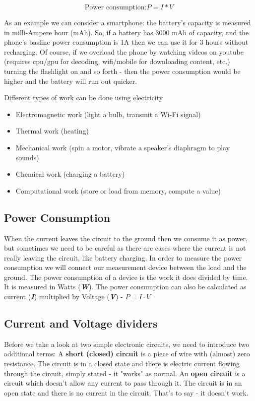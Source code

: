 \begin{displaymath}\label{eq:power_consumption}
    \textrm{Power consumption:} P=I*V
\end{displaymath}

As an example we can consider a smartphone: the battery's capacity is measured in milli-Ampere hour (mAh).
So, if a battery has 3000 mAh of capacity, and the phone's basline power consumption is 1A  then we can use it
for 3 hours without recharging. Of course, if we overload the phone by watching videos on youtube (requires cpu/gpu for decoding, wifi/mobile for downloading content, etc.)
turning the flashlight on and so forth - then the power consumption would be higher and the battery will run out quicker. 

Different types of work can be done using electricity
\begin{itemize}
    \item Electromagnetic work (light a bulb, transmit a Wi-Fi signal)
    \item Thermal work (heating)
    \item Mechanical work (spin a motor, vibrate a speaker's diaphragm to play sounds)
    \item Chemical work (charging a battery)
    \item Computational work (store or load from memory, compute a value)
\end{itemize}

\subsection{Power Consumption}

When the current leaves the circuit to the ground then we consume it as power,
but sometimes we need to be careful as there are cases where the current is not really
leaving the circuit, like battery charging. In order to measure the power consumption we
will connect our measurement device between the load and the ground. The power
consumption of a device is the work it does divided by time. It is measured in
Watts (\textbf{\textit{W}}). The power consumption can also be calculated as current
(\textbf{\textit{I}}) multiplied by Voltage (\textbf{\textit{V}}) - $P = I \cdot V$

\subsection{Current and Voltage dividers}
Before we take a look at two simple electronic circuits, we need to introduce
two additional terms: A \textbf{short (closed) circuit} is a piece of wire with
(almost) zero resistance. The circuit is in a closed state and there is
electric current flowing through the circuit, simply stated - it "works" as normal. An \textbf{open
circuit} is a circuit which doesn't allow any current to pass through it. The
circuit is in an open state and there is no current in the circuit. That's to
say - it doesn't work.

